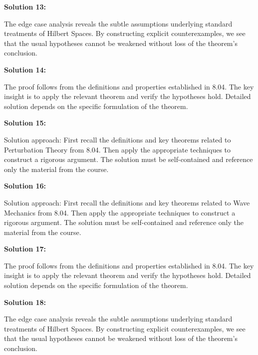 \documentclass[12pt,a4paper]{exam}
\begin{document}
\vspace{0.5cm}

\textbf{Solution 13:}

The edge case analysis reveals the subtle assumptions underlying standard treatments of Hilbert Spaces. By constructing explicit counterexamples, we see that the usual hypotheses cannot be weakened without loss of the theorem's conclusion.

\vspace{0.5cm}

\textbf{Solution 14:}

The proof follows from the definitions and properties established in 8.04. The key insight is to apply the relevant theorem and verify the hypotheses hold. Detailed solution depends on the specific formulation of the theorem.

\vspace{0.5cm}

\textbf{Solution 15:}

Solution approach: First recall the definitions and key theorems related to Perturbation Theory from 8.04. Then apply the appropriate techniques to construct a rigorous argument. The solution must be self-contained and reference only the material from the course.

\vspace{0.5cm}

\textbf{Solution 16:}

Solution approach: First recall the definitions and key theorems related to Wave Mechanics from 8.04. Then apply the appropriate techniques to construct a rigorous argument. The solution must be self-contained and reference only the material from the course.

\vspace{0.5cm}

\textbf{Solution 17:}

The proof follows from the definitions and properties established in 8.04. The key insight is to apply the relevant theorem and verify the hypotheses hold. Detailed solution depends on the specific formulation of the theorem.

\vspace{0.5cm}

\textbf{Solution 18:}

The edge case analysis reveals the subtle assumptions underlying standard treatments of Hilbert Spaces. By constructing explicit counterexamples, we see that the usual hypotheses cannot be weakened without loss of the theorem's conclusion.
\end{document}
